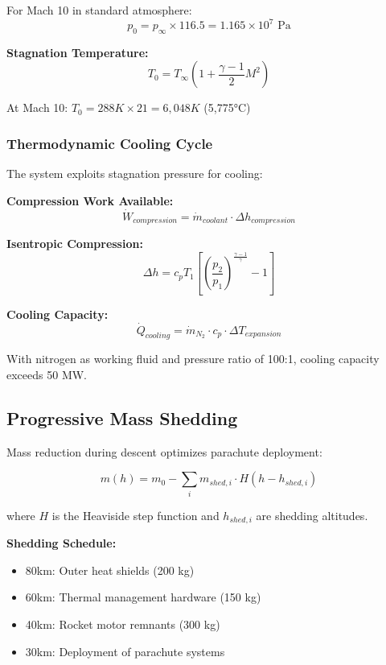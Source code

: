 \documentclass[11pt,a4paper]{article}
\begin{document}
For Mach 10 in standard atmosphere:
\begin{equation}
p_0 = p_\infty \times 116.5 = 1.165 \times 10^7 \text{ Pa}
\end{equation}

\textbf{Stagnation Temperature:}
\begin{equation}
T_0 = T_\infty \left(1 + \frac{\gamma-1}{2}M^2\right)
\end{equation}

At Mach 10: $T_0 = 288K \times 21 = 6,048K$ (5,775°C)

\subsubsection{Thermodynamic Cooling Cycle}

The system exploits stagnation pressure for cooling:

\textbf{Compression Work Available:}
\begin{equation}
\dot{W}_{compression} = \dot{m}_{coolant} \cdot \Delta h_{compression}
\end{equation}

\textbf{Isentropic Compression:}
\begin{equation}
\Delta h = c_p T_1 \left[\left(\frac{p_2}{p_1}\right)^{\frac{\gamma-1}{\gamma}} - 1\right]
\end{equation}

\textbf{Cooling Capacity:}
\begin{equation}
\dot{Q}_{cooling} = \dot{m}_{N_2} \cdot c_p \cdot \Delta T_{expansion}
\end{equation}

With nitrogen as working fluid and pressure ratio of 100:1, cooling capacity exceeds 50 MW.

\subsection{Progressive Mass Shedding}

Mass reduction during descent optimizes parachute deployment:

\begin{equation}
m(h) = m_0 - \sum_{i} m_{shed,i} \cdot H(h - h_{shed,i})
\end{equation}

where $H$ is the Heaviside step function and $h_{shed,i}$ are shedding altitudes.

\textbf{Shedding Schedule:}
\begin{itemize}
    \item 80km: Outer heat shields (200 kg)
    \item 60km: Thermal management hardware (150 kg)
    \item 40km: Rocket motor remnants (300 kg)
    \item 30km: Deployment of parachute systems
\end{itemize}
\end{document}
